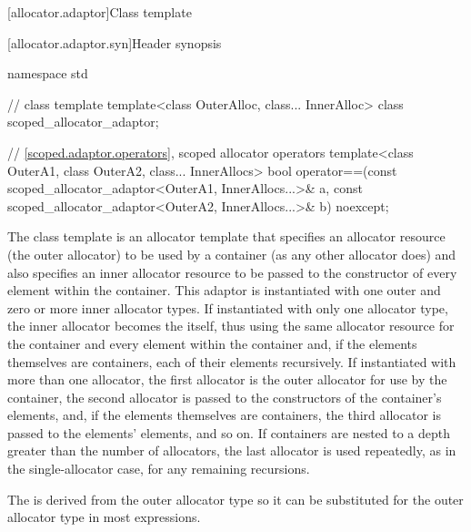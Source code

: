 [allocator.adaptor]{Class template }

[allocator.adaptor.syn]{Header  synopsis}

%
\begin{codeblock}
namespace std {
  // class template 
  template<class OuterAlloc, class... InnerAlloc>
    class scoped_allocator_adaptor;

  // \ref{scoped.adaptor.operators}, scoped allocator operators
  template<class OuterA1, class OuterA2, class... InnerAllocs>
    bool operator==(const scoped_allocator_adaptor<OuterA1, InnerAllocs...>& a,
                    const scoped_allocator_adaptor<OuterA2, InnerAllocs...>& b) noexcept;
}
\end{codeblock}

\pnum
The class template  is an allocator template that
specifies an allocator resource (the outer allocator) to be used by a container (as any
other allocator does) and also specifies an inner allocator resource to be passed to the
constructor of every element within the container. This adaptor is instantiated with one
outer and zero or more inner allocator types. If instantiated with only one allocator
type, the inner allocator becomes the  itself, thus
using the same allocator resource for the container and every element within the
container and, if the elements themselves are containers, each of their elements
recursively. If instantiated with more than one allocator, the first allocator is the
outer allocator for use by the container, the second allocator is passed to the
constructors of the container's elements, and, if the elements themselves are
containers, the third allocator is passed to the elements' elements, and so on. If
containers are nested to a depth greater than the number of allocators, the last
allocator is used repeatedly, as in the single-allocator case, for any remaining
recursions.
\begin{note}
The  is derived from the outer
allocator type so it can be substituted for the outer allocator type in most
expressions.
\end{note}

